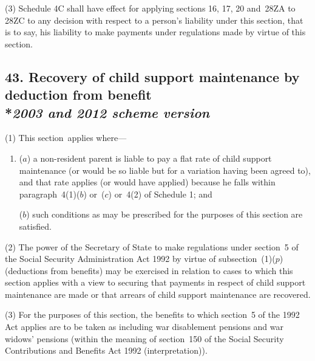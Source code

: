 \documentclass[12pt,a4paper]{article}
\begin{document}
(3) Schedule 4C shall have effect for applying sections 16, 17, 20 and~28ZA to 28ZC to any decision with respect to a person’s liability under this section, that is to say, his liability to make payments under regulations made by virtue of this section.


\subsection[43. Recovery of child support maintenance by deduction from benefit --- \emph{2003 and 2012 scheme version}]{43. Recovery of child support maintenance by deduction from benefit\\*\emph{2003 and 2012 scheme version}}

(1) This section~applies where—
\begin{enumerate}\item[]
($a$) a non-resident parent is liable to pay a flat rate of child support maintenance (or would be so liable but for a variation having been agreed to), and that rate applies (or would have applied) because he falls within paragraph~4(1)($b$)  or~($c$)  or~4(2)  of Schedule 1; and

($b$) such conditions as may be prescribed for the purposes of this section are satisfied.
\end{enumerate}

(2) The power of the Secretary of State to make regulations under section~5 of the Social Security Administration Act 1992 by virtue of subsection~(1)($p$)  (deductions from benefits) may be exercised in relation to cases to which this section applies with a view to securing that payments in respect of child support maintenance are made or that arrears of child support maintenance are recovered.

(3) For the purposes of this section, the benefits to which section~5 of the 1992 Act applies are to be taken as including war disablement pensions and war widows' pensions (within the meaning of section~150 of the Social Security Contributions and Benefits Act 1992 (interpretation)).
\end{document}

